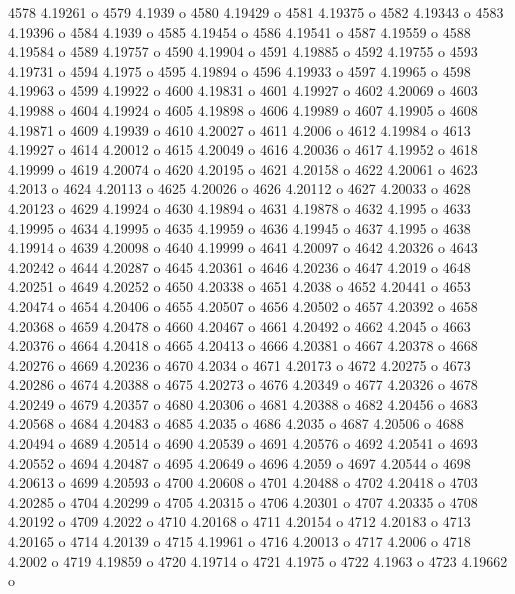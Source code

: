  4578  4.19261  o
 4579  4.1939  o
 4580  4.19429  o
 4581  4.19375  o
 4582  4.19343  o
 4583  4.19396  o
 4584  4.1939  o
 4585  4.19454  o
 4586  4.19541  o
 4587  4.19559  o
 4588  4.19584  o
 4589  4.19757  o
 4590  4.19904  o
 4591  4.19885  o
 4592  4.19755  o
 4593  4.19731  o
 4594  4.1975  o
 4595  4.19894  o
 4596  4.19933  o
 4597  4.19965  o
 4598  4.19963  o
 4599  4.19922  o
 4600  4.19831  o
 4601  4.19927  o
 4602  4.20069  o
 4603  4.19988  o
 4604  4.19924  o
 4605  4.19898  o
 4606  4.19989  o
 4607  4.19905  o
 4608  4.19871  o
 4609  4.19939  o
 4610  4.20027  o
 4611  4.2006  o
 4612  4.19984  o
 4613  4.19927  o
 4614  4.20012  o
 4615  4.20049  o
 4616  4.20036  o
 4617  4.19952  o
 4618  4.19999  o
 4619  4.20074  o
 4620  4.20195  o
 4621  4.20158  o
 4622  4.20061  o
 4623  4.2013  o
 4624  4.20113  o
 4625  4.20026  o
 4626  4.20112  o
 4627  4.20033  o
 4628  4.20123  o
 4629  4.19924  o
 4630  4.19894  o
 4631  4.19878  o
 4632  4.1995  o
 4633  4.19995  o
 4634  4.19995  o
 4635  4.19959  o
 4636  4.19945  o
 4637  4.1995  o
 4638  4.19914  o
 4639  4.20098  o
 4640  4.19999  o
 4641  4.20097  o
 4642  4.20326  o
 4643  4.20242  o
 4644  4.20287  o
 4645  4.20361  o
 4646  4.20236  o
 4647  4.2019  o
 4648  4.20251  o
 4649  4.20252  o
 4650  4.20338  o
 4651  4.2038  o
 4652  4.20441  o
 4653  4.20474  o
 4654  4.20406  o
 4655  4.20507  o
 4656  4.20502  o
 4657  4.20392  o
 4658  4.20368  o
 4659  4.20478  o
 4660  4.20467  o
 4661  4.20492  o
 4662  4.2045  o
 4663  4.20376  o
 4664  4.20418  o
 4665  4.20413  o
 4666  4.20381  o
 4667  4.20378  o
 4668  4.20276  o
 4669  4.20236  o
 4670  4.2034  o
 4671  4.20173  o
 4672  4.20275  o
 4673  4.20286  o
 4674  4.20388  o
 4675  4.20273  o
 4676  4.20349  o
 4677  4.20326  o
 4678  4.20249  o
 4679  4.20357  o
 4680  4.20306  o
 4681  4.20388  o
 4682  4.20456  o
 4683  4.20568  o
 4684  4.20483  o
 4685  4.2035  o
 4686  4.2035  o
 4687  4.20506  o
 4688  4.20494  o
 4689  4.20514  o
 4690  4.20539  o
 4691  4.20576  o
 4692  4.20541  o
 4693  4.20552  o
 4694  4.20487  o
 4695  4.20649  o
 4696  4.2059  o
 4697  4.20544  o
 4698  4.20613  o
 4699  4.20593  o
 4700  4.20608  o
 4701  4.20488  o
 4702  4.20418  o
 4703  4.20285  o
 4704  4.20299  o
 4705  4.20315  o
 4706  4.20301  o
 4707  4.20335  o
 4708  4.20192  o
 4709  4.2022  o
 4710  4.20168  o
 4711  4.20154  o
 4712  4.20183  o
 4713  4.20165  o
 4714  4.20139  o
 4715  4.19961  o
 4716  4.20013  o
 4717  4.2006  o
 4718  4.2002  o
 4719  4.19859  o
 4720  4.19714  o
 4721  4.1975  o
 4722  4.1963  o
 4723  4.19662  o
